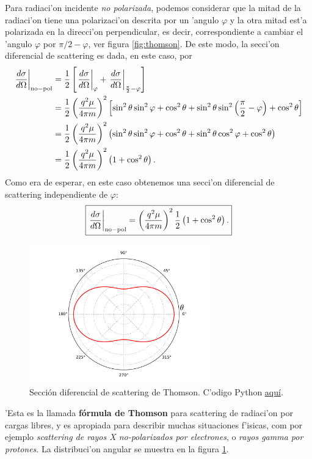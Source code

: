 Para radiaci'on incidente \textit{no polarizada}, podemos considerar que la
mitad de la radiaci'on tiene una polarizaci'on descrita por un 'angulo $\varphi$
y la otra mitad est'a polarizada en la direcci'on perpendicular, es decir,
correspondiente a cambiar el 'angulo $\varphi$ por ${\pi}/{2}-\varphi$, ver figura  \ref{fig:thomson}. De este modo, la secci'on diferencial de scattering es dada, en este caso, por
\begin{align}
\left. \frac{d\sigma}{d\Omega}\right|_{\rm no-pol}&=\frac{1}{2}\left[\left.
\frac{d\sigma}{d\Omega}\right|_\varphi+\left.
\frac{d\sigma}{d\Omega}\right|_{\frac{\pi}{2}-\varphi}\right] \\
&=\frac{1}{2}\left(\frac{q^2\mu}{4\pi m}\right)^2\left[\sin^2\theta\sin^2\varphi +\cos^2\theta +\sin^2\theta\sin^2\left(\frac{\pi}{2}-\varphi\right) +\cos^2\theta\right]\\
&=\frac{1}{2}\left(\frac{q^2\mu}{4\pi m}\right)^2\left(\sin^2\theta\sin^2\varphi +\cos^2\theta +\sin^2\theta\cos^2\varphi +\cos^2\theta\right)\\
&=\frac{1}{2}\left(\frac{q^2\mu}{4\pi m}\right)^2\left(1+\cos^2\theta\right).
\end{align}
Como era de esperar, en este caso obtenemos una secci'on diferencial de scattering independiente de $\varphi$:
\begin{equation}
\boxed{\left.\frac{d\sigma}{d\Omega}\right|_{\rm no-pol}=\left(\frac{q^2\mu}{4\pi m}\right)^2\frac{1}
{2}\left(1+\cos^2\theta\right) .}
\end{equation}
\begin{figure}[H]
\centerline{\includegraphics[height=6cm]{fig/fig-Thomson.pdf}}
 \caption{Secci\'on diferencial de scattering de Thomson. C'odigo Python \href{https://github.com/gfrubi/electrodinamica/blob/master/figuras-editables/fig-Thomson.py}{aqu\'i}.}
\label{fig:thomson_2d}
\end{figure}
'Esta es la llamada \textbf{fórmula de Thomson} para scattering de radiaci'on
por cargas libres, y es apropiada para describir muchas situaciones f'isicas, com por ejemplo \textit{scattering de rayos X no-polarizados por electrones}, o \textit{rayos gamma por protones}. 
La distribuci'on angular se muestra en la figura \ref{fig:thomson_2d}. 

